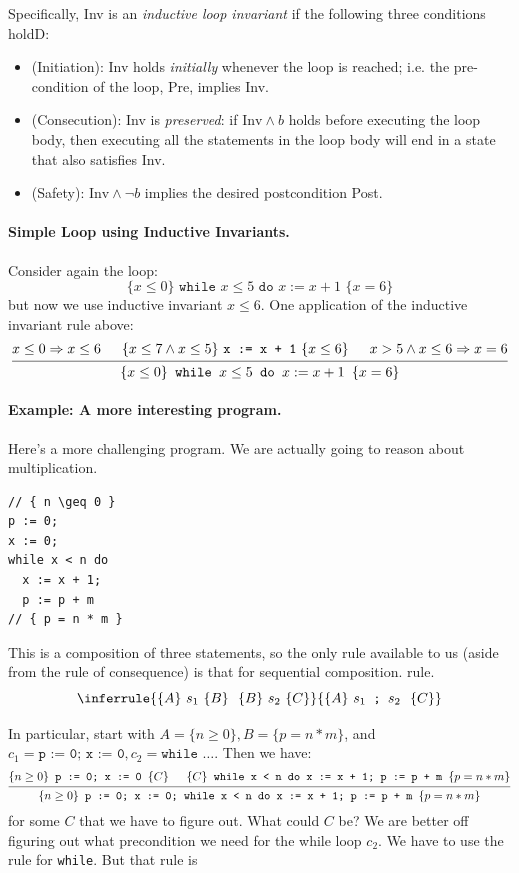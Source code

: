 \documentclass[11pt]{article}
\begin{document}
Specifically, Inv is an \emph{inductive loop invariant} if the following three conditions holdD:
\begin{itemize}[noitemsep]
\item (Initiation): Inv holds \emph{initially} whenever the loop is reached; i.e. the pre-condition of the loop, Pre,
  implies Inv.
\item (Consecution): Inv is \emph{preserved}: if $\mathrm{Inv} \wedge b$ holds before executing the loop body, then executing all the statements in the loop body will end in a state that also satisfies Inv.
\item (Safety): $\mathrm{Inv} \wedge \neg b$ implies the desired postcondition Post.
\end{itemize}

\paragraph{Simple Loop using Inductive Invariants.} Consider again the loop:
\[ \{ x \leq 0 \} \texttt{~while $x \leq 5$ do $x := x + 1$~}  \{ x=6\} \]
but now we use inductive invariant $x \leq 6$. One application of the inductive invariant rule above:
\[
\begin{prooftree}
  \hypo{x \leq 0 \Rightarrow x \leq 6}
  \hypo{\{ x \leq 7 \wedge x \leq 5 \} ~\texttt{x := x + 1}~ \{ x \leq 6 \}}
  \hypo{x > 5 \wedge x \leq 6 \Rightarrow x = 6}
  \infer3{\{ x \leq 0\}\texttt{~while $x \leq 5$ do $x := x + 1$~}  \{ x=6\}}
\end{prooftree}
\]

\paragraph{Example: A more interesting program.} Here's a more challenging program.
We are actually going to reason about multiplication.

\begin{lstlisting}
// { n \geq 0 }
p := 0;
x := 0;
while x < n do
  x := x + 1;
  p := p + m
// { p = n * m }
\end{lstlisting}

This is a composition of three statements, so the only rule available to us (aside from the rule of consequence) is that for sequential composition.
rule.
\[
  \inferrule{\{A\}~s_1~\{B\} ~~ \{B\}~s_2~\{C\}}{\{A\}~s_1 \texttt{~;~} s_2~~\{C\}}
\]

In particular, start with $A = \{ n \geq 0 \}, B = \{ p = n * m \}$, and $c_1 = \texttt{p := 0; x := 0}, c_2 = \texttt{while \ldots}$. Then we have:
\[
\begin{prooftree}
\hypo{\{ n \geq 0 \} \texttt{~p := 0; x := 0~} \{ C \}}
\hypo{\{ C \} \texttt{~while x < n do x := x + 1; p := p + m~} \{ p = n * m \}}
\infer2{\{ n \geq 0 \} \texttt{~p := 0; x := 0; while x < n do x := x + 1; p := p + m~} \{ p = n * m \}}
\end{prooftree}
\]
for some $C$ that we have to figure out. What could $C$ be? We are better off figuring out what precondition we need for the while loop $c_2$. We have to use the rule for \texttt{while}. But that rule is
\end{document}
